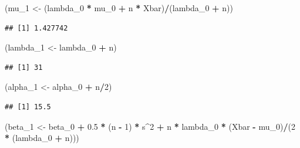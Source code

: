 \documentclass[
  12pt,
]{book}
\newenvironment{Shaded}{\begin{snugshade}}{\end{snugshade}}
\newcommand{\DecValTok}[1]{\textcolor[rgb]{0.00,0.00,0.81}{#1}}
\newcommand{\FloatTok}[1]{\textcolor[rgb]{0.00,0.00,0.81}{#1}}
\newcommand{\NormalTok}[1]{#1}
\newcommand{\OperatorTok}[1]{\textcolor[rgb]{0.81,0.36,0.00}{\textbf{#1}}}
\newcommand{\StringTok}[1]{\textcolor[rgb]{0.31,0.60,0.02}{#1}}
\begin{document}
\begin{Shaded}
\begin{Highlighting}[]
\NormalTok{(mu\_}\DecValTok{1}\NormalTok{ \textless{}{-}}\StringTok{ }\NormalTok{(lambda\_}\DecValTok{0} \OperatorTok{*}\StringTok{ }\NormalTok{mu\_}\DecValTok{0} \OperatorTok{+}\StringTok{ }\NormalTok{n }\OperatorTok{*}\StringTok{ }\NormalTok{Xbar)}\OperatorTok{/}\NormalTok{(lambda\_}\DecValTok{0} \OperatorTok{+}\StringTok{ }\NormalTok{n))}
\end{Highlighting}
\end{Shaded}

\begin{verbatim}
## [1] 1.427742
\end{verbatim}

\begin{Shaded}
\begin{Highlighting}[]
\NormalTok{(lambda\_}\DecValTok{1}\NormalTok{ \textless{}{-}}\StringTok{ }\NormalTok{lambda\_}\DecValTok{0} \OperatorTok{+}\StringTok{ }\NormalTok{n)}
\end{Highlighting}
\end{Shaded}

\begin{verbatim}
## [1] 31
\end{verbatim}

\begin{Shaded}
\begin{Highlighting}[]
\NormalTok{(alpha\_}\DecValTok{1}\NormalTok{ \textless{}{-}}\StringTok{ }\NormalTok{alpha\_}\DecValTok{0} \OperatorTok{+}\StringTok{ }\NormalTok{n}\OperatorTok{/}\DecValTok{2}\NormalTok{)}
\end{Highlighting}
\end{Shaded}

\begin{verbatim}
## [1] 15.5
\end{verbatim}

\begin{Shaded}
\begin{Highlighting}[]
\NormalTok{(beta\_}\DecValTok{1}\NormalTok{ \textless{}{-}}\StringTok{ }\NormalTok{beta\_}\DecValTok{0} \OperatorTok{+}\StringTok{ }\FloatTok{0.5} \OperatorTok{*}\StringTok{ }\NormalTok{(n }\OperatorTok{{-}}\StringTok{ }\DecValTok{1}\NormalTok{) }\OperatorTok{*}\StringTok{ }\NormalTok{s}\OperatorTok{\^{}}\DecValTok{2} \OperatorTok{+}\StringTok{ }\NormalTok{n }\OperatorTok{*}\StringTok{ }\NormalTok{lambda\_}\DecValTok{0} \OperatorTok{*}\StringTok{ }
\StringTok{    }\NormalTok{(Xbar }\OperatorTok{{-}}\StringTok{ }\NormalTok{mu\_}\DecValTok{0}\NormalTok{)}\OperatorTok{/}\NormalTok{(}\DecValTok{2} \OperatorTok{*}\StringTok{ }\NormalTok{(lambda\_}\DecValTok{0} \OperatorTok{+}\StringTok{ }\NormalTok{n)))}
\end{Highlighting}
\end{Shaded}
\end{document}
